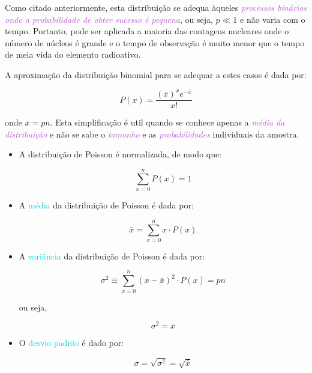 \documentclass[11pt,a4paper]{article}
\begin{document}
		Como citado anteriormente, esta distribuição se adequa àqueles \textcolor{MediumOrchid}{\textit{
			processos binários onde a probabilidade de obter sucesso é pequena}}, ou seja, $p \ll 1$ e não varia com o tempo. Portanto, pode ser aplicada a maioria das contagens nucleares onde o número de núcleos é grande e o tempo de observação é muito menor que o tempo de meia vida do elemento radioativo. 

		A aproximação da distribuição binomial para se adequar a estes casos é dada por:

			\begin{equation}
				P(x) = \frac{(\bar{x})^x e^{-\bar{x}}}{x!}
			\end{equation}

		\noindent onde $\bar{x} = pn$. Esta simplificação é util quando se conhece apenas a \textcolor{MediumOrchid}{\textit{média da distribuição}} e não se sabe o \textcolor{MediumOrchid}{\textit{tamanho}} e as \textcolor{MediumOrchid}{\textit{probabilidades}} individuais da amostra. 

		\begin{itemize}
			\item A distribuição de Poisson é normalizada, de modo que:
			
				\begin{equation}
					\sum_{x = 0}^{n} P(x) = 1
				\end{equation}

			\item A \textcolor{DarkTurquoise}{média} da distribuição de Poisson é dada por:
			
				\begin{equation}
					\bar{x} = \sum_{x = 0}^{n} x \cdot P(x)
				\end{equation}

			\item A \textcolor{DarkTurquoise}{variância} da distribuição de Poisson é dada por:
			
				\begin{equation}
					\sigma^2 \equiv \sum_{x = 0}^{n} (x - \bar{x})^2 \cdot P(x) = pn
				\end{equation}

				ou seja,

				\begin{equation}
					\sigma^2 = \bar{x}
				\end{equation}

			\item O \textcolor{DarkTurquoise}{desvio padrão} é dado por:
			
				\begin{equation}
					\sigma = \sqrt{\sigma^2} = \sqrt{\bar{x}}
				\end{equation}

		\end{itemize}
\end{document}
